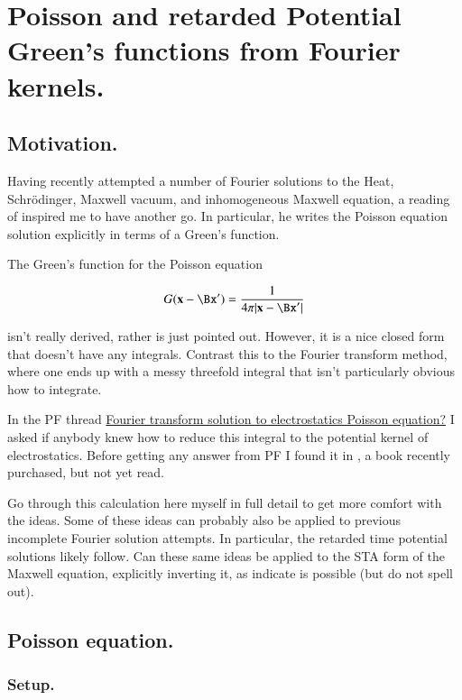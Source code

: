 \chapter{Poisson and retarded Potential Green's functions from Fourier kernels.}\label{chap:PJpoisson}
\date{Feb 18, 2009.  poisson.tex}

\section{Motivation.}

Having recently attempted a number of Fourier solutions to the Heat, Schr\"{o}dinger, Maxwell vacuum, and inhomogeneous Maxwell equation, a reading
of \cite{mjPerryElectrodynamics} inspired me to have another go.  In particular, he writes the Poisson equation solution explicitly in terms of a Green's
function.

The Green's function for the Poisson equation

\begin{align}
G(\mathbf{x} - \Bx') = \frac{1}{4\pi\lvert{\mathbf{x} -\Bx'}\rvert}
\end{align}

isn't really derived, rather is just pointed out.  However, it is a nice closed form that doesn't have any integrals.
Contrast this to the Fourier transform method, where one ends up with a messy threefold
integral that isn't particularly obvious how to integrate.

In the PF thread \href{http://www.physicsforums.com/showthread.php?t=293550}{Fourier transform solution to electrostatics Poisson equation?}
I asked if anybody knew how to reduce this integral to the
potential kernel of electrostatics.  Before getting any answer from PF I found it in
\cite{byron1992mca}, a book recently purchased, but not yet read.


Go through this calculation here myself in full detail to get more comfort with the ideas.  Some of these ideas can probably also be applied to
previous incomplete Fourier solution attempts.  In particular, the retarded time potential solutions likely follow.
Can these same ideas be applied to the STA form of the Maxwell equation, explicitly inverting it, as
\cite{doran2003gap} indicate is possible (but do not spell out).

\section{Poisson equation. }
\subsection{Setup. }

